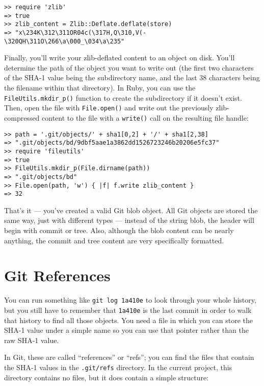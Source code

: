 \documentclass[a4paper]{book}
\begin{document}
\begin{shaded}\begin{verbatim}
>> require 'zlib'
=> true
>> zlib_content = Zlib::Deflate.deflate(store)
=> "x\234K\312\311OR04c(\317H,Q\310,V(-\320QH\311O\266\a\000_\034\a\235"
\end{verbatim}\end{shaded}

Finally, you'll write your zlib-deflated content to an object on disk. You'll determine the path of the object you want to write out (the first two characters of the SHA-1 value being the subdirectory name, and the last 38 characters being the filename within that directory). In Ruby, you can use the \texttt{FileUtils.mkdir\_p()} function to create the subdirectory if it doesn't exist. Then, open the file with \texttt{File.open()} and write out the previously zlib-compressed content to the file with a \texttt{write()} call on the resulting file handle:

\begin{shaded}\begin{verbatim}
>> path = '.git/objects/' + sha1[0,2] + '/' + sha1[2,38]
=> ".git/objects/bd/9dbf5aae1a3862dd1526723246b20206e5fc37"
>> require 'fileutils'
=> true
>> FileUtils.mkdir_p(File.dirname(path))
=> ".git/objects/bd"
>> File.open(path, 'w') { |f| f.write zlib_content }
=> 32
\end{verbatim}\end{shaded}

That's it --- you've created a valid Git blob object. All Git objects are stored the same way, just with different types --- instead of the string blob, the header will begin with commit or tree. Also, although the blob content can be nearly anything, the commit and tree content are very specifically formatted.

\section{Git References}

You can run something like \texttt{git log 1a410e} to look through your whole history, but you still have to remember that \texttt{1a410e} is the last commit in order to walk that history to find all those objects. You need a file in which you can store the SHA-1 value under a simple name so you can use that pointer rather than the raw SHA-1 value.

In Git, these are called “references” or “refs”; you can find the files that contain the SHA-1 values in the \texttt{.git/refs} directory. In the current project, this directory contains no files, but it does contain a simple structure:
\end{document}
